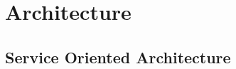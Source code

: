 \documentclass[\main/main.tex]{subfiles}
\begin{document}
\chapter{Architecture}
\section{Service Oriented Architecture}
\end{document}

